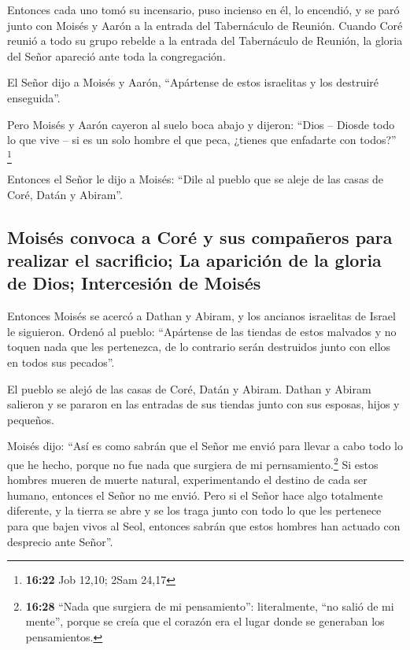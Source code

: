  Entonces cada uno tomó su incensario, puso incienso en
él, lo encendió, y se paró junto con Moisés y Aarón a la entrada del
Tabernáculo de Reunión.  Cuando Coré reunió a todo su
grupo rebelde a la entrada del Tabernáculo de Reunión, la gloria del
Señor apareció ante toda la congregación.

 El Señor dijo a Moisés y Aarón, 
``Apártense de estos israelitas y los destruiré enseguida''.

 Pero Moisés y Aarón cayeron al suelo boca abajo y
dijeron: ``Dios -- Diosde todo lo que vive -- si es un solo hombre el
que peca, ¿tienes que enfadarte con todos?'' \footnote{\textbf{16:22}
  Job 12,10; 2Sam 24,17}

 Entonces el Señor le dijo a Moisés: 
``Dile al pueblo que se aleje de las casas de Coré, Datán y Abiram''.

\hypertarget{moisuxe9s-convoca-a-coruxe9-y-sus-compauxf1eros-para-realizar-el-sacrificio-la-apariciuxf3n-de-la-gloria-de-dios-intercesiuxf3n-de-moisuxe9s-1}{%
\subsection{Moisés convoca a Coré y sus compañeros para realizar el
sacrificio; La aparición de la gloria de Dios; Intercesión de
Moisés}\label{moisuxe9s-convoca-a-coruxe9-y-sus-compauxf1eros-para-realizar-el-sacrificio-la-apariciuxf3n-de-la-gloria-de-dios-intercesiuxf3n-de-moisuxe9s-1}}

 Entonces Moisés se acercó a Dathan y Abiram, y los
ancianos israelitas de Israel le siguieron.  Ordenó al
pueblo: ``Apártense de las tiendas de estos malvados y no toquen nada
que les pertenezca, de lo contrario serán destruidos junto con ellos en
todos sus pecados''.

 El pueblo se alejó de las casas de Coré, Datán y Abiram.
Dathan y Abiram salieron y se pararon en las entradas de sus tiendas
junto con sus esposas, hijos y pequeños.

 Moisés dijo: ``Así es como sabrán que el Señor me envió
para llevar a cabo todo lo que he hecho, porque no fue nada que surgiera
de mi pernsamiento.\footnote{\textbf{16:28} ``Nada que surgiera de mi
  pensamiento'': literalmente, ``no salió de mi mente'', porque se creía
  que el corazón era el lugar donde se generaban los pensamientos.}
 Si estos hombres mueren de muerte natural,
experimentando el destino de cada ser humano, entonces el Señor no me
envió.  Pero si el Señor hace algo totalmente diferente,
y la tierra se abre y se los traga junto con todo lo que les pertenece
para que bajen vivos al Seol, entonces sabrán que estos hombres han
actuado con desprecio ante Señor''.

